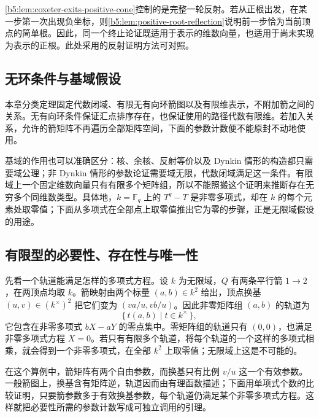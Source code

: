 \ProseParagraphBreak

\cref{b5:lem:coxeter-exits-positive-cone}控制的是完整一轮反射。若从正根出发，在某一步第一次出现负坐标，则\cref{b5:lem:positive-root-reflection}说明前一步恰为当前顶点的简单根。因此，同一个终止论证既适用于表示的维数向量，也适用于尚未实现为表示的正根。此处采用的反射证明方法可对照\cite[Sections 6.7--6.8, pp. 169--172]{EtingofEtAl2011RepresentationTheory}。

\subsection{无环条件与基域假设}
\label{b5:subsec:1003:03}

本章分类定理固定代数闭域、有限无有向环箭图以及有限维表示，不附加箭之间的关系。无有向环条件保证汇点排序存在，也保证使用的路径代数有限维。若加入关系，允许的箭矩阵不再遍历全部矩阵空间，下面的参数计数便不能原封不动地使用。

\ProseParagraphBreak

基域的作用也可以准确区分：核、余核、反射等价以及 Dynkin 情形的构造都只需要域公理；非 Dynkin 情形的参数论证需要域无限，代数闭域满足这一条件。有限域上一个固定维数向量只有有限多个矩阵组，所以不能照搬这个证明来推断存在无穷多个同维数类型。具体地，\(k=\mathbb F_q\) 上的 \(T^q-T\) 是非零多项式，却在 \(k\) 的每个元素处取零值；下面从多项式在全部点上取零值推出它为零的步骤，正是无限域假设的用途。

\subsection{有限型的必要性、存在性与唯一性}
\label{b5:subsec:1003:04}

先看一个轨道能满足怎样的多项式方程。设 \(k\) 为无限域，\(Q\) 有两条平行箭 \(1\to2\)，在两顶点均取 \(k\)。箭映射由两个标量 \((a,b)\in k^2\) 给出，顶点换基 \((u,v)\in(k^\times)^2\) 把它们变为 \((va/u,vb/u)\)。因此非零矩阵组 \((a,b)\) 的轨道为
\[
	\{\,t(a,b)\mid t\in k^\times\,\},
\]
它包含在非零多项式 \(bX-aY\) 的零点集中。零矩阵组的轨道只有 \((0,0)\)，也满足非零多项式方程 \(X=0\)。若只有有限多个轨道，将每个轨道的一个这样的多项式相乘，就会得到一个非零多项式，在全部 \(k^2\) 上取零值；无限域上这是不可能的。

\ProseParagraphBreak

在这个算例中，箭矩阵有两个自由参数，而换基只有比例 \(v/u\) 这一个有效参数。一般箭图上，换基含有矩阵逆，轨道因而由有理函数描述；下面用单项式个数的比较证明，只要箭参数多于有效换基参数，每个轨道仍满足某个非零多项式方程。这样就把必要性所需的参数计数写成可独立调用的引理。

